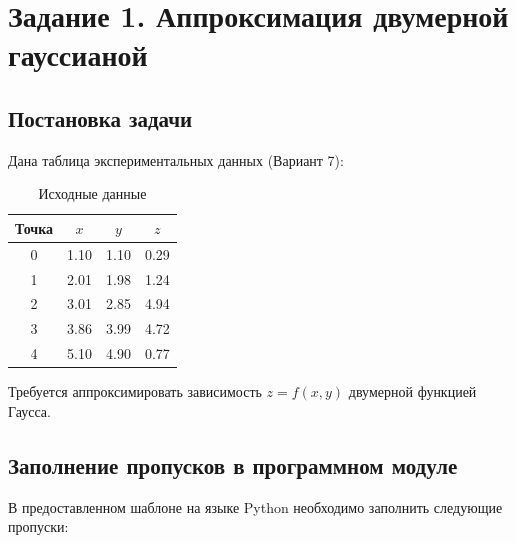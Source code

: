 \section{Задание 1. Аппроксимация двумерной гауссианой}

\subsection{Постановка задачи}

Дана таблица экспериментальных данных (Вариант 7):

\begin{table}[H]
    \centering
    \caption{Исходные данные}
    \label{tab:data}
    \begin{tabular}{|c|c|c|c|}
        \hline
        \textbf{Точка} & \textbf{$x$} & \textbf{$y$} & \textbf{$z$} \\
        \hline
        0 & 1.10 & 1.10 & 0.29 \\
        1 & 2.01 & 1.98 & 1.24 \\
        2 & 3.01 & 2.85 & 4.94 \\
        3 & 3.86 & 3.99 & 4.72 \\
        4 & 5.10 & 4.90 & 0.77 \\
        \hline
    \end{tabular}
\end{table}

Требуется аппроксимировать зависимость $z = f(x, y)$ двумерной функцией Гаусса.

\subsection{Заполнение пропусков в программном модуле}

В предоставленном шаблоне на языке Python необходимо заполнить следующие пропуски:

